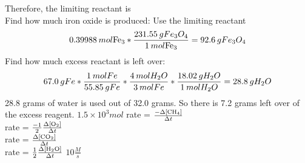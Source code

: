 \documentclass{article}
\begin{document}
Therefore, the limiting reactant is  \\
Find how much iron oxide is produced: Use the limiting reactant
\begin{equation}
    0.39988\hspace{0.2em}mol \ce{Fe_{3}} * \frac{231.55\hspace{0.2em}gFe_{3}O_{4}}{1\hspace{0.2em} mol\ce{Fe_{3}}} = 92.6 \hspace{0.2em}g Fe_{3}O_{4}
\end{equation}
Find how much excess reactant is left over:
\begin{equation}
    67.0\hspace{0.2em}gFe * \frac{1\hspace{0.2em}molFe}{55.85\hspace{0.2em}gFe} * \frac{4\hspace{0.2em}mol H_{2}O}{3\hspace{0.2em}molFe} * \frac{18.02\hspace{0.2em}gH_{2}O}{1\hspace{0.2em}molH_{2}O} = 28.8\hspace{0.2em}g H_{2}O
\end{equation}
28.8 grams of water is used out of 32.0 grams. So there is 7.2 grams left over of the excess reagent. 
\AnswerSet
\(1.5 \times 10^3mol\) 
\AnswerSet 
{} \hspace{0.5em} rate = \(\frac{-\Delta [\ce{CH4}]}{\Delta t}\) \\
 \hspace{0.5em} rate = \(\frac{-1}{2} \frac{\Delta [\ce{O2}]}{\Delta t}\) \\
 \hspace{0.5em} rate = \(\frac{\Delta [\ce{CO2}]}{\Delta t}\) \\
 \hspace{0.5em} rate = \(\frac{1}{2} \frac{\Delta [\ce{H2O}]}{\Delta t}\)
\AnswerSet
\(10\frac{M}{s}\)
\end{document}
